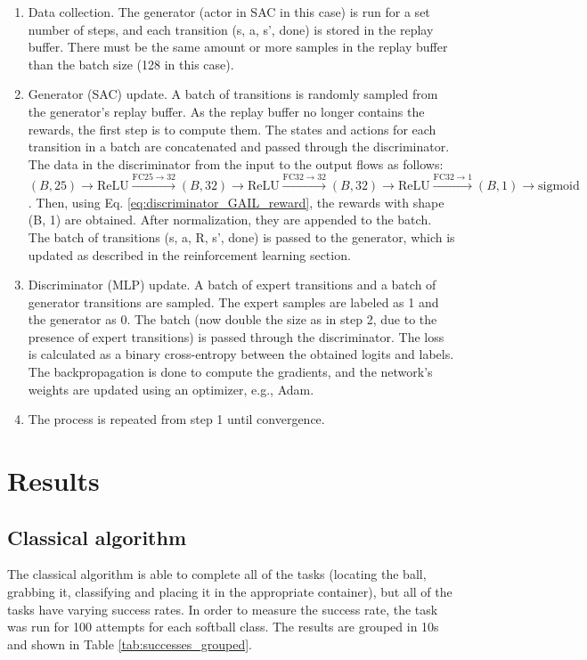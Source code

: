 \begin{enumerate}
  \item Data collection. The generator (actor in SAC in this case) is run for a set number of steps, and each transition (s, a, s', done) is stored in the replay buffer. There must be the same amount or more samples in the replay buffer than the batch size (128 in this case).
  \item Generator (SAC) update. A batch of transitions is randomly sampled from the generator's replay buffer. As the replay buffer no longer contains the rewards, the first step is to compute them. The states and actions for each transition in a batch are concatenated and passed through the discriminator. The data in the discriminator from the input to the output flows as follows: $(B, 25) \rightarrow \text{ReLU}  \xrightarrow{\text{FC} 25 \rightarrow 32} (B, 32) \rightarrow \text{ReLU}  \xrightarrow{\text{FC} 32 \rightarrow 32} (B, 32) \rightarrow \text{ReLU}  \xrightarrow{\text{FC} 32 \rightarrow 1} (B, 1) \rightarrow \text{sigmoid}$. Then, using Eq. \ref{eq:discriminator_GAIL_reward}, the rewards with shape (B, 1) are obtained. After normalization, they are appended to the batch. The batch of transitions (s, a, R, s', done) is passed to the generator, which is updated as described in the reinforcement learning section.
  \item Discriminator (MLP) update. A batch of expert transitions and a batch of generator transitions are sampled. The expert samples are labeled as 1 and the generator as 0. The batch (now double the size as in step 2, due to the presence of expert transitions) is passed through the discriminator. The loss is calculated as a binary cross-entropy between the obtained logits and labels. The backpropagation is done to compute the gradients, and the network's weights are updated using an optimizer, e.g., Adam.
  \item The process is repeated from step 1 until convergence.
\end{enumerate}

\section{Results}
\subsection{Classical algorithm}
The classical algorithm is able to complete all of the tasks (locating the ball, grabbing it, classifying and placing it in the appropriate container), but all of the tasks have varying success rates. In order to measure the success rate, the task was run for 100 attempts for each softball class. The results are grouped in 10s and shown in Table \ref{tab:successes_grouped}.

